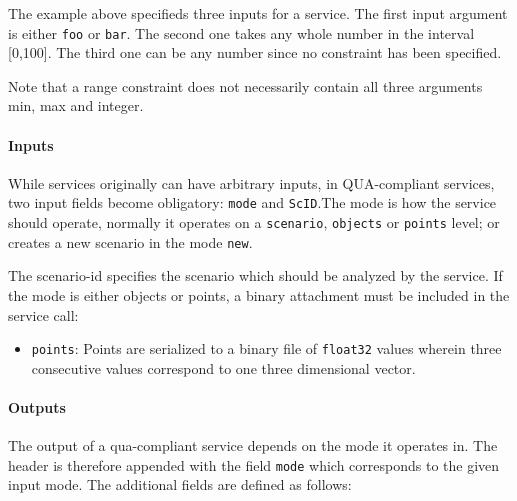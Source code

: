 The example above specifieds three inputs for a service. The first input argument is either \texttt{foo} or \texttt{bar}. The second one takes any whole number in the interval [0,100]. The third one can be any number since no constraint has been specified.

Note that a range constraint does not necessarily contain all three arguments min, max and integer.

\paragraph{Inputs}
While services originally can have arbitrary inputs, in QUA-compliant services, two input fields become obligatory: \texttt{mode} and \texttt{ScID}.The mode is how the service should operate, normally it operates on a \texttt{scenario}, \texttt{objects} or \texttt{points} level; or creates a new scenario in the mode \texttt{new}.

The scenario-id specifies the scenario which should be analyzed by the service. If the mode is either objects or points, a binary attachment must be included in the service call:
\begin{itemize}
  \item \texttt{points}: Points are serialized to a binary file of \texttt{float32} values wherein three consecutive values correspond to one three dimensional vector.
\end{itemize}

\paragraph{Outputs}
The output of a qua-compliant service depends on the mode it operates in. The header is therefore appended with the field \texttt{mode} which corresponds to the given input mode. The additional fields are defined as follows:

